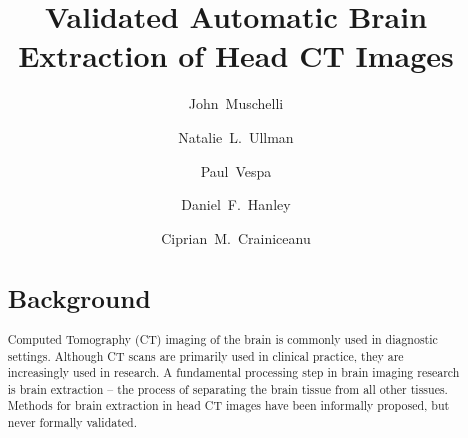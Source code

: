\documentclass{elsarticle}\usepackage[]{graphicx}\usepackage[]{color}
\begin{document}
\renewcommand{\thesubfigure}{\Alph{subfigure}}

\begin{frontmatter}

\date{}

\title{Validated Automatic Brain Extraction of Head CT Images}

% 
% 
% 
% 
% 


\author[jhsph]{John~Muschelli}

\author[jhmi]{Natalie~L.~Ullman}

\author[ucla]{Paul~Vespa}


\author[jhmi]{Daniel~F.~Hanley}

\author[jhsph]{Ciprian~M.~Crainiceanu}


\address[jhsph]{Department of Biostatistics, Bloomberg School of Public Health, Johns Hopkins University, Baltimore, MD, USA}
\address[jhmi]{Department of Neurology, Division of Brain Injury Outcomes,  Johns Hopkins Medical Institutions, Baltimore, MD, USA}
\address[ucla]{Department of Neurosurgery, David Geffen School of Medicine at UCLA, Los Angeles, CA, USA}


\begin{abstract}
\section*{Background}
Computed Tomography (CT) imaging of the brain is commonly used in diagnostic settings.  Although CT scans are primarily used in clinical practice, they are increasingly used in research.  A fundamental processing step in brain imaging research is brain extraction -- the process of separating the brain tissue from all other tissues. Methods for brain extraction in head CT images have been informally proposed, but never formally validated.



\end{abstract}
\end{frontmatter}
\end{document}
